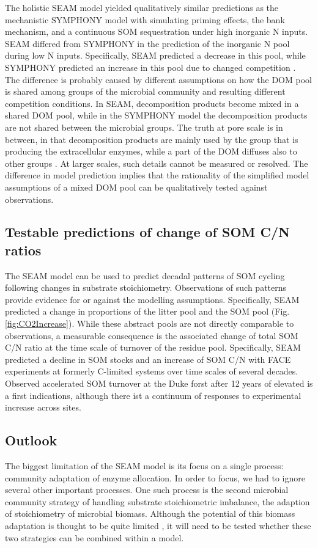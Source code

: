 The holistic SEAM model yielded qualitatively similar predictions as the
mechanistic SYMPHONY model with simulating priming effects, the bank mechanism,
and a continuous SOM sequestration under high inorganic N inputs. SEAM differed
from SYMPHONY in the prediction of the inorganic N pool during low N inputs.
Specifically, SEAM predicted a decrease in this pool, while SYMPHONY predicted
an increase in this pool due to changed competition \citep{Perveen14}. The
difference is probably caused by different assumptions on how the DOM pool is
shared among groups of the microbial community and resulting different
competition conditions. In SEAM, decomposition products become mixed in a shared
DOM pool, while in the SYMPHONY model the decomposition products are not shared
between the microbial groups.
The truth at pore scale is in between, in that decomposition products are mainly
used by the group that is producing the extracellular enzymes, while a part of
the DOM diffuses also to other groups \citep{Kaiser14}. At larger scales, such
details cannot be measured or resolved. The difference in model prediction
implies that the rationality of the simplified model assumptions of a mixed DOM
pool can be qualitatively tested against observations.

\subsection{Testable predictions of change of SOM C/N ratios}
The SEAM model can be used to predict decadal patterns of SOM cycling following
changes in substrate stoichiometry. Observations of such patterns provide evidence
for or against the modelling assumptions.
Specifically, SEAM predicted a change in proportions of the litter pool and the
SOM pool (Fig. \ref{fig:CO2Increase}). While these abstract pools are not
directly comparable to observations, a measurable consequence is the associated
change of total SOM C/N ratio at the time scale of turnover of the residue
pool. Specifically, SEAM predicted a decline in SOM stocks and an increase of
SOM C/N with FACE experiments at formerly C-limited systems over time scales of
several decades. Observed accelerated SOM turnover at the Duke forst after 12
years of elevated  \citep{Drake11} is a first indications, although
there ist a continuum of responses to experimental  increase across sites.
 
\subsection{Outlook} 
The biggest limitation of the SEAM model is its focus on a single process:
community adaptation of enzyme allocation. In order to focus, we had to ignore
several other important processes. One such process is the second microbial
community strategy of handling substrate stoichiometric imbalance, the adaption
of stoichiometry of microbial biomass. Although the potential of this biomass
adaptation is thought to be quite limited \citep{Mooshammer14}, it will need to
be tested whether these two strategies can be combined within a model.


